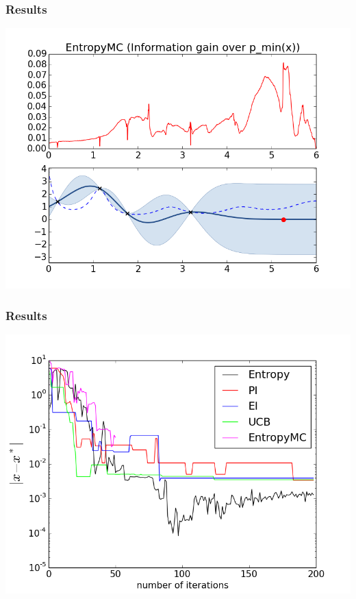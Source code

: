 \documentclass[10pt,handout]{beamer}
\begin{document}
\begin{frame}
\frametitle{Results}
\includegraphics[width=\textwidth]{EntropyMC.png}
\end{frame}
\begin{frame}
\frametitle{Results}

\includegraphics[width=\textwidth]{plot_branin2.png}

\end{frame}
\end{document}
